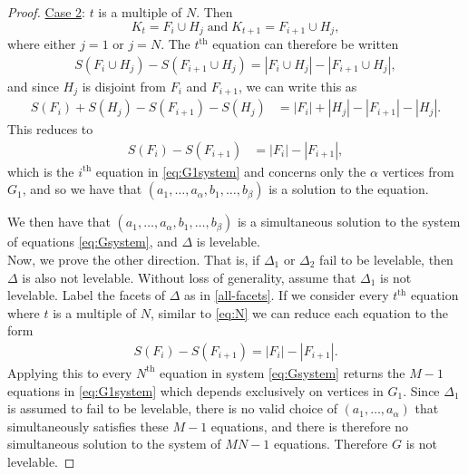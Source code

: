 \begin{proof}
\noindent
\underline{Case 2}: $t$ is a multiple of $N$. Then 
$$
K_t = F_i \cup H_j \; \textrm{and} \; K_{t+1} = F_{i+1} \cup H_j,
$$
where either $j=1$ or $j=N$. The $t^{\textrm{th}}$ equation can therefore be written
\begin{equation} \label{eq:N}
\begin{aligned}
S(F_{i} \cup H_{j}) - S(F_{ i+1} \cup H_{j}) = | F_{i} \cup H_{j}| - |F_{i+1} \cup H_{j}|,
\end{aligned}
\end{equation}
and since $H_j$ is disjoint from $F_i$ and $F_{i+1}$, we can write this as
\begin{equation*}
\begin{aligned}
S(F_{i}) + S(H_{j}) -  S(F_{i+1})  -S(H_{j})  &= | F_{i} | + | H_{j}| - | F_{i+1}| - |H_{j}|.
\end{aligned}
\end{equation*}
This reduces to
\begin{equation*}
\begin{aligned}
S(F_{i})-   S(F_{i+1})   &= | F_{i} | - | F_{i+1}|,
\end{aligned}
\end{equation*}
which is the $i^{\textrm{th}}$ equation in \eqref{eq:G1system} and concerns only the $\alpha$ vertices from $G_1$, and so we have that $(a_1, \dots, a_\alpha, b_1, \dots,  b_\beta)$ is a solution to the equation.

We then have that $(a_1, \dots, a_\alpha, b_1, \dots, b_\beta)$ is a simultaneous solution to the system of equations \eqref{eq:Gsystem}, and $\Delta$ is levelable. \\


Now, we prove the other direction. That is, if $\Delta_1$ or $\Delta_2$ fail to be levelable, then $\Delta$ is also not levelable. Without loss of generality, assume that $\Delta_1$ is not levelable. Label the facets of $\Delta$ as in \eqref{all-facets}. If we consider every $t^{\textrm{th}}$ equation where $t$ is a multiple of $N$, similar to \eqref{eq:N} we can reduce each equation to the form
\begin{equation}
\begin{aligned}
S(F_i) - S(F_{i+1}) = |F_i| - |F_{i+1}|. 
\end{aligned}
\end{equation}
Applying this to every $N^{\textrm{th}}$ equation in system \eqref{eq:Gsystem} returns the $M-1$ equations in \eqref{eq:G1system} which depends exclusively on vertices in $G_1$. Since $\Delta_1$ is assumed to fail to be levelable, there is no valid choice of $(a_1, \dots, a_\alpha)$ that simultaneously satisfies these $M-1$ equations, and there is therefore no simultaneous solution to the system of $MN-1$ equations. Therefore $G$ is not levelable. 
\end{proof}


